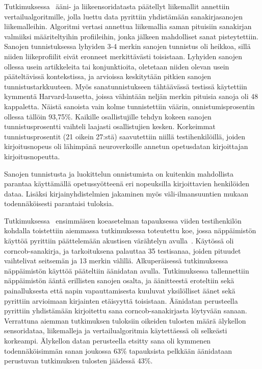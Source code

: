 \documentclass[finnish]{tktltiki2}
\theoremstyle{definition}
\theoremstyle{remark}
\begin{document}
Tutkimuksessa~\cite{maiti} ääni- ja liikeensoridatasta päätellyt liikemallit annettiin vertailualgoritmille, jolla luettu data pyrittiin yhdistämään sanakirjasanojen liikemalleihin. Algoritmi vertasi annettua liikemallia saman pituisiin sanakirjan valmiiksi määriteltyihin profiileihin, jonka jälkeen mahdolliset sanat pisteytettiin. Sanojen tunnistuksessa lyhyiden 3-4 merkin sanojen tunnistus oli heikkoa, sillä niiden liikeprofiilit eivät eronneet merkittävästi toisistaan. Lyhyiden sanojen ollessa usein artikkeleita tai konjunktioita, oletetaan niiden olevan usein pääteltävissä kontekstissa, ja arvioissa keskitytään pitkien sanojen tunnistustarkkuuteen. Myös sanatunnistukseen tähtäävässä testissä käytettiin kymmentä Harvard-lausetta, joissa vähintään neljän merkin pituisia sanoja oli 48 kappaletta. Näistä sanoista vain kolme tunnistettiin väärin, onnistumisprosentin ollessa tällöin 93,75\%. Kaikille osallistujille tehdyn kokeen sanojen tunnistusprosentti vaihteli laajasti osallistujien kesken. Korkeimmat tunnistusprosentit (21 oikein 27:stä) saavutettiin niillä testihenkilöillä, joiden kirjoitusnopeus oli lähimpänä neuroverkoille annetun opetusdatan kirjoittajan kirjoitusnopeutta. 

Sanojen tunnistusta ja luokittelun onnistumista on kuitenkin mahdollista parantaa käyttämällä opetussyötteenä eri nopeuksilla kirjoittavien henkilöiden dataa. Lisäksi kirjainyhdistelmien jakaminen myös väli-ilmansuuntien mukaan todennäköisesti parantaisi tuloksia.

Tutkimuksessa~\cite{liu} ensimmäisen koeasetelman tapauksessa viiden testihenkilön kohdalla toistettiin aiemmassa tutkimuksessa toteutettu koe, jossa näppäimistön käyttöä pyrittiin päättelemään akustisen värähtelyn avulla~\cite{berger}. Käytössä oli corncob-sanakirja, ja tarkoituksena palauttaa 35 testisanaa, joiden pituudet vaihtelivat seitsemän ja 13 merkin välillä.
Alkuperäisessä tutkimuksessa~\cite{berger} näppäimistön käyttöä pääteltiin äänidatan avulla. Tutkimuksessa tallennettiin näppäimistön ääntä erillisten sanojen osalta, ja äänitteestä eroteltiin sekä painalluksesta että napin vapauttamisesta kuuluvat yksilölliset äänet sekä pyrittiin arvioimaan kirjainten etäisyyttä toisistaan. Äänidatan perusteella pyrittiin yhdistämään kirjoitettu sana corncob-sanakirjasta löytyvään sanaan. Verrattuna aiemman tutkimuksen tuloksiin oikeiden tulosten määrä älykellon sensoridataa, liikemalleja ja vertailualgoritmia käytettäessä oli selkeästi korkeampi. Älykellon datan perusteella etsitty sana oli kymmenen todennäköisimmän sanan joukossa 63\% tapauksista pelkkään äänidataan perustuvan tutkimuksen tulosten jäädessä 43\%.
\linebreak
\end{document}
